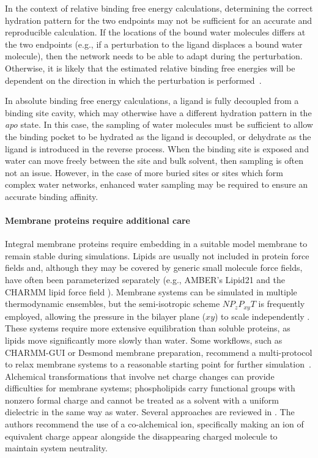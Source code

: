 \documentclass[9pt,bestpractices]{livecoms}
\begin{document}
In the context of relative binding free energy calculations, determining the correct hydration pattern for the two endpoints may not be sufficient for an accurate and reproducible calculation. If the locations of the bound water molecules differs at the two endpoints (e.g., if a perturbation to the ligand displaces a bound water molecule), then the network needs to be able to adapt during the perturbation. Otherwise, it is likely that the estimated relative binding free energies will be dependent on the direction in which the perturbation is performed~\cite{ross2020enhancing}.

In absolute binding free energy calculations, a ligand is fully decoupled from a binding site cavity, which may otherwise have a different hydration pattern in the \textit{apo} state. In this case, the sampling of water molecules must be sufficient to allow the binding pocket to be hydrated as the ligand is decoupled, or dehydrate as the ligand is introduced in the reverse process. When the binding site is exposed and water can move freely between the site and bulk solvent, then sampling is often not an issue. However, in the case of more buried sites or sites which form complex water networks, enhanced water sampling may be required to ensure an accurate binding affinity.

\paragraph{Membrane proteins require additional care}
Integral membrane proteins require embedding in a suitable model membrane to remain stable during simulations. Lipids are usually not included in protein force fields and, although they may be covered by generic small molecule force fields, have often been parameterized separately (e.g., AMBER's Lipid21 \cite{AMBERLipid21} and the CHARMM lipid force field \cite{CHARMMLipidFF}). Membrane systems can be simulated in multiple thermodynamic ensembles, but the semi-isotropic scheme $NP_{z}P_{xy}T$ is frequently employed, allowing the pressure in the bilayer plane ($xy$) to scale independently \cite{LipidBestPracticesCOMS}. These systems require more extensive equilibration than soluble proteins, as lipids move significantly more slowly than water. Some workflows, such as CHARMM-GUI or Desmond membrane preparation, recommend a multi-protocol to relax membrane systems to a reasonable starting point for further simulation~\cite{https://doi.org/10.1002/jcc.23702,DesmondManual}.  Alchemical transformations that involve net charge changes can provide difficulties for membrane systems; phospholipids carry functional groups with nonzero formal charge and cannot be treated as a solvent with a uniform dielectric in the same way as water. Several approaches are reviewed in \cite{wu2022correction-51c}. The authors recommend the use of a co-alchemical ion, specifically making an ion of equivalent charge appear alongside the disappearing charged molecule to maintain system neutrality.
\end{document}
